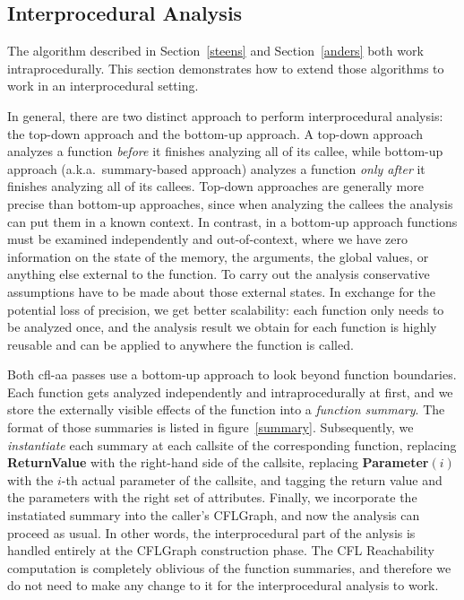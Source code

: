\documentclass[10pt]{article}
\begin{document}
\subsection{Interprocedural Analysis}\label{interproc}

The algorithm described in Section~\ref{steens} and Section~\ref{anders} both
work intraprocedurally. This section demonstrates how to extend those algorithms
to work in an interprocedural setting.

In general, there are two distinct approach to perform interprocedural analysis:
the top-down approach and the bottom-up approach. A top-down approach analyzes a
function \emph{before} it finishes analyzing all of its callee, while
bottom-up approach (a.k.a.\ summary-based approach) analyzes a function \emph{only
after} it finishes analyzing all of its callees. Top-down approaches are
generally more precise than bottom-up approaches, since when analyzing the
callees the analysis can put them in a known context. In contrast, in a
bottom-up approach functions
must be examined independently and out-of-context, where we
have zero information on the state of the memory, the arguments, the global
values, or anything else external to the function. To carry out the analysis
conservative assumptions have to be made about those external states. In
exchange for the potential loss of precision, we get better scalability: each
function only needs to be analyzed once, and the analysis result we obtain for
each function is highly reusable and can be applied to anywhere the function is
called.

Both cfl-aa passes use a bottom-up approach to look beyond function boundaries.
Each function gets analyzed independently and intraprocedurally at first, and we store the
externally visible effects of the function into a \emph{function summary}. The format
of those summaries is listed in figure~\ref{summary}. Subsequently, we
\emph{instantiate} each summary at each callsite of the corresponding function, replacing
\textbf{ReturnValue} with the right-hand side of the callsite, 
replacing \textbf{Parameter}$(i)$ with the $i$-th actual parameter of the
callsite, and tagging the return value and the parameters with the right set of
attributes. Finally, we incorporate the instatiated summary into the caller's
CFLGraph, and now the analysis can proceed as usual. In other words, the
interprocedural part of the anlysis is handled entirely at the CFLGraph
construction phase. The CFL Reachability computation is completely oblivious of
the function summaries, and therefore we do not need to make any change to it
for the interprocedural analysis to work.  
\end{document}
